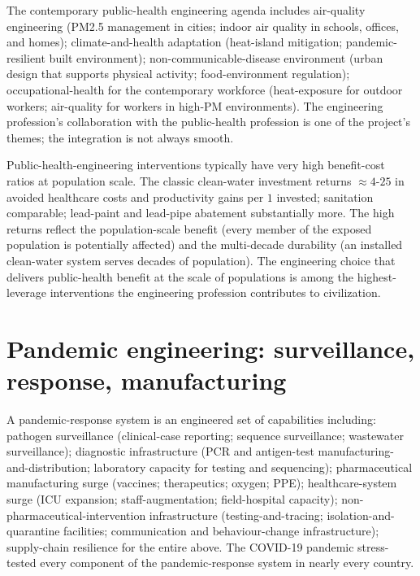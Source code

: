 The contemporary public-health engineering agenda includes air-quality engineering (PM2.5 management in cities; indoor air quality in schools, offices, and homes); climate-and-health adaptation (heat-island mitigation; pandemic-resilient built environment); non-communicable-disease environment (urban design that supports physical activity; food-environment regulation); occupational-health for the contemporary workforce (heat-exposure for outdoor workers; air-quality for workers in high-PM environments). The engineering profession's collaboration with the public-health profession is one of the project's themes; the integration is not always smooth.

\begin{archetype}
Public-health-engineering interventions typically have very high benefit-cost ratios at population scale. The classic clean-water investment returns $\approx 4$-$25$ in avoided healthcare costs and productivity gains per $1$ invested; sanitation comparable; lead-paint and lead-pipe abatement substantially more. The high returns reflect the population-scale benefit (every member of the exposed population is potentially affected) and the multi-decade durability (an installed clean-water system serves decades of population). The engineering choice that delivers public-health benefit at the scale of populations is among the highest-leverage interventions the engineering profession contributes to civilization.
\end{archetype}

\section{Pandemic engineering: surveillance, response, manufacturing}

A pandemic-response system is an engineered set of capabilities including: pathogen surveillance (clinical-case reporting; sequence surveillance; wastewater surveillance); diagnostic infrastructure (PCR and antigen-test manufacturing-and-distribution; laboratory capacity for testing and sequencing); pharmaceutical manufacturing surge (vaccines; therapeutics; oxygen; PPE); healthcare-system surge (ICU expansion; staff-augmentation; field-hospital capacity); non-pharmaceutical-intervention infrastructure (testing-and-tracing; isolation-and-quarantine facilities; communication and behaviour-change infrastructure); supply-chain resilience for the entire above. The COVID-19 pandemic stress-tested every component of the pandemic-response system in nearly every country.

